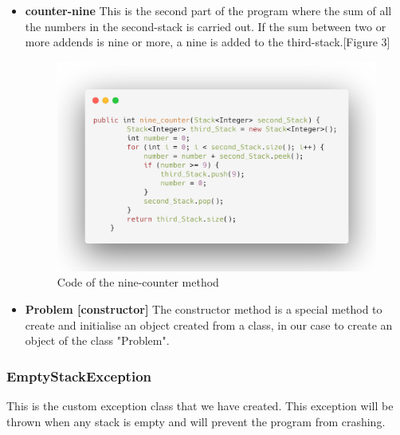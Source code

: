 \documentclass[a4paper]{article}
\theoremstyle{plain}
\theoremstyle{definition}
\begin{document}
\begin{itemize}
\newpage
                \item \textbf{counter-nine}
                This is the second part of the program where the sum of all the numbers in the second-stack is carried out. If the sum between two or more addends is nine or more, a nine is added to the third-stack.[Figure 3]
                \begin{figure}[h]
                     \centering
                     \includegraphics[width=300pt\textwidth]{counter-nine.png}
                     \caption{Code of the nine-counter method}
                     \label{fig:mesh1}
                \end{figure}

                \item \textbf{Problem [constructor]}
                The constructor method is a special method to create and initialise an object created from a class, in our case to create an object of the class "Problem".

            \end{itemize}
        \subsubsection{EmptyStackException}
        This is the custom exception class that we have created. This exception will be thrown when any stack is empty and will prevent the program from crashing.
\end{document}
